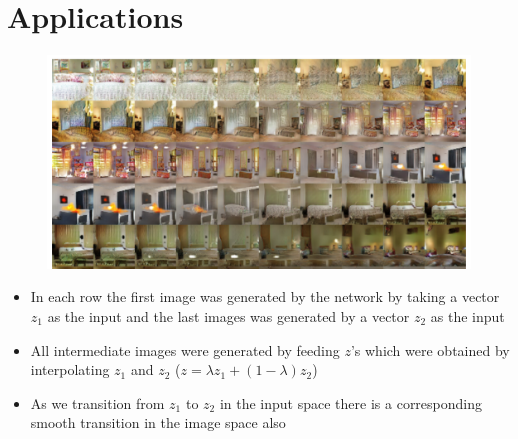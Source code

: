 \section{Applications}
\begin{frame}
\end{frame}

\begin{frame}
	\begin{figure}[h!]
		\includegraphics[scale=0.40]{images/Interpolation.png}
	\end{figure}
	\begin{itemize}
		\item<1-> In each row the first image was generated by the network by taking a vector $z_1$ as the input and the last images was generated by a vector $z_2$ as the input
		\item<2-> All intermediate images were generated by feeding $z$'s which were obtained by interpolating $z_1$ and $z_2$ ($z = \lambda z_1 + (1-\lambda)z_2$)
		\item<3-> As we transition from $z_1$ to $z_2$ in the input space there is a corresponding smooth transition in the image space also
	\end{itemize}
\end{frame}

